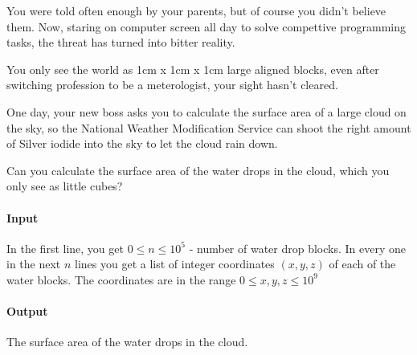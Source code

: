 



\makeheader

You were told often enough by your parents, but of course you didn't believe them.
Now, staring on computer screen all day to solve compettive programming tasks, the threat has turned into bitter reality.

You only see the world as 1cm x 1cm x 1cm large aligned blocks, even after switching profession to be a meterologist, your sight hasn't cleared.

One day, your new boss asks you to calculate the surface area of a large cloud on the sky, so the National Weather Modification Service can shoot the right amount of Silver iodide into the sky to let the cloud rain down.

Can you calculate the surface area of the water drops in the cloud, which you only see as little cubes?

\paragraph*{Input}

In the first line, you get $0 \leq n \leq 10^5$ - number of water drop blocks.
In every one in the next $n$ lines you get a list of integer coordinates $(x, y, z)$ of each of the water blocks. The coordinates are in the range $0 \leq x, y, z \leq 10^9$

\paragraph*{Output}

The surface area of the water drops in the cloud.

\begin{samples}
\end{samples}

